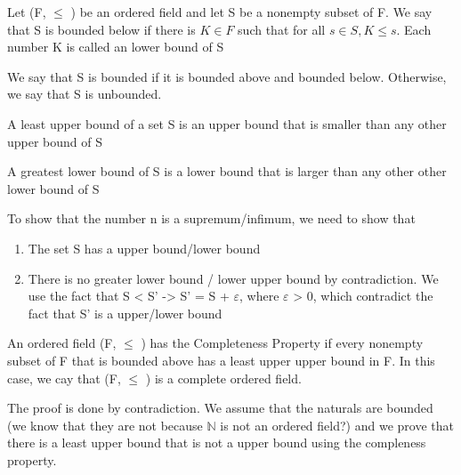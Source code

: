 \documentclass{article}
\begin{document}
\begin{definition}
    Let (F, $\leq$ ) be an ordered field and let S be a nonempty subset of F.
    We say that S is bounded below if there is $ K \in F$ such that for all
    $s \in S, K \leq s$. Each number K is called an lower bound of S
\end{definition}

\begin{definition}
    We say that S is bounded if it is bounded above and bounded below. Otherwise,
    we say that S is unbounded.
\end{definition}

\begin{definition}[Supremum]
    A least upper bound of a set S is an upper bound that is smaller than any
    other upper bound of S
\end{definition}

\begin{definition}[Infimum]
    A greatest lower bound of S is a lower bound that is larger than any other
    other lower bound of S
\end{definition}

\begin{remark}
    To show that the number n is a supremum/infimum, we need to show that
    \begin{enumerate}
	\item The set S has a upper bound/lower bound
	\item There is no greater lower bound / lower upper bound by contradiction.
	    We use the fact that S < S' -> S' = S + $\varepsilon$, where
	    $\varepsilon$ > 0, which contradict the fact that S' is a upper/lower
	    bound
    \end{enumerate}
\end{remark}

\begin{definition}
    An ordered field (F, $\leq$ ) has the Completeness Property if every nonempty
    subset of F that is bounded above has a least upper upper bound in F. In this
    case, we cay that (F, $\leq$ ) is a complete ordered field.
\end{definition}

\begin{remark}
    The proof is done by contradiction. We assume that the naturals are bounded
    (we know that they are not because $\mathbb{N}$ is not an ordered field?) and
    we prove that there is a least upper bound that is not a upper bound using
    the compleness property.
\end{remark}
\end{document}
